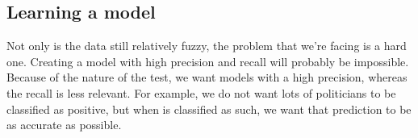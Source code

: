 \subsection{Learning a model}
Not only is the data still relatively fuzzy, the problem that we're facing is a hard one. Creating a model with high precision and recall will probably be impossible. Because of the nature of the test, we want models with a high precision, whereas the recall is less relevant. For example, we do not want lots of politicians to be classified as positive, but when is classified as such, we want that prediction to be as accurate as possible.
